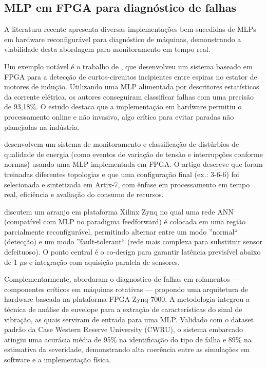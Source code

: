 \subsection{MLP em FPGA para diagnóstico de falhas}
\label{subsection:MLP}
A literatura recente apresenta diversas implementações bem-sucedidas de MLPs em hardware reconfigurável para diagnóstico de máquinas, demonstrando a viabilidade desta abordagem para monitoramento em tempo real.

Um exemplo notável é o trabalho de , que desenvolveu um sistema baseado em FPGA para a detecção de curtos-circuitos incipientes entre espiras no estator de motores de indução. Utilizando uma MLP alimentada por descritores estatísticos da corrente elétrica, os autores conseguiram classificar falhas com uma precisão de 93,18\%. O estudo destaca que a implementação em hardware permitiu o processamento online e não invasivo, algo crítico para evitar paradas não planejadas na indústria.

 desenvolvem um sistema de monitoramento e classificação de distúrbios de qualidade de energia (como eventos de variação de tensão e interrupções conforme normas) usando uma MLP implementada em FPGA. O artigo descreve que foram treinadas diferentes topologias e que uma configuração final (ex.: 3-6-6) foi selecionada e sintetizada em Artix-7, com ênfase em processamento em tempo real, eficiência e avaliação do consumo de recursos.

 discutem um arranjo em plataforma Xilinx Zynq no qual uma rede ANN (compatível com MLP no paradigma feedforward) é colocada em uma região parcialmente reconfigurável, permitindo alternar entre um modo ''normal`` (detecção) e um modo ''fault-tolerant`` (rede mais complexa para substituir sensor defeituoso). O ponto central é o co-design para garantir latência previsível abaixo de 1 $\mu$s e integração com aquisição paralela de sensores.


Complementarmente,  abordaram o diagnostico de falhas em rolamentos — componentes críticos em máquinas rotativas — propondo uma arquitetura de hardware baseada na plataforma FPGA Zynq-7000. A metodologia integrou a técnica de análise de envelope para a extração de características do sinal de vibração, as quais serviram de entrada para uma MLP. Validado com o dataset padrão da Case Western Reserve University (CWRU), o sistema embarcado atingiu uma acurácia média de 95\% na identificação do tipo de falha e 89\% na estimativa da severidade, demonstrando alta coerência entre as simulações em software e a implementação física.

